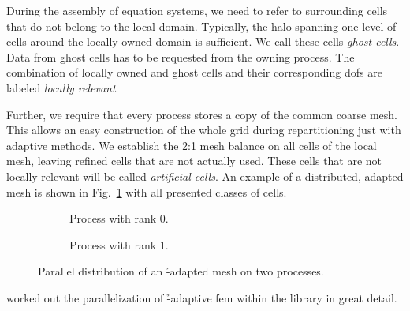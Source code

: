 During the assembly of equation systems, we need to refer to surrounding cells that do not belong to the local domain. Typically, the halo spanning one level of cells around the locally owned domain is sufficient. We call these cells \textit{ghost cells}. Data from ghost cells has to be requested from the owning process. The combination of locally owned and ghost cells and their corresponding \glspl{dof} are labeled \textit{locally relevant}.

Further, we require that every process stores a copy of the common coarse mesh. This allows an easy construction of the whole grid during repartitioning just with adaptive methods. We establish the 2:1 mesh balance on all cells of the local mesh, leaving refined cells that are not actually used. These cells that are not locally relevant will be called \textit{artificial cells}. An example of a distributed, adapted mesh is shown in Fig.~\ref{fig:paralleldistribution} with all presented classes of cells.

\begin{figure}
\begin{subfigure}{.49\textwidth}
  \centering
  
  \caption{Process with rank 0.}
\end{subfigure}
\begin{subfigure}{.49\textwidth}
  \centering
  
  \caption{Process with rank 1.}
\end{subfigure}
\caption{Parallel distribution of an \h-adapted mesh on two processes.}
\label{fig:paralleldistribution}
\end{figure}




\textcite{bangerth2012} worked out the parallelization of \h-adaptive \gls{fem} within the \dealii{} library in great detail.